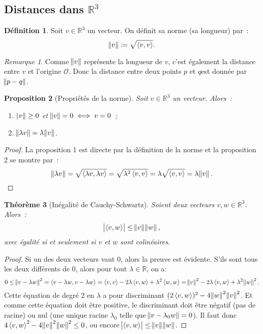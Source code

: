 \documentclass{article}
\newcommand{\R}{\mathbb R}
\newcommand{\scpr}[2]{\left\langle #1, #2\right\rangle}
\newtheorem{thm}{Théorème}[section]
\newtheorem{prp}[thm]{Proposition}
\theoremstyle{definition}
\newtheorem{déf}[thm]{Définition}
\theoremstyle{remark}
\newtheorem*{rmq}{Remarque}
\begin{document}
	\subsection{Distances dans $\R^3$}
		\begin{déf} Soit $v \in \R^3$ un vecteur. On définit sa norme (sa longueur) par~: \[\norm v \coloneqq \sqrt {\scpr vv}.\] \end{déf}

		\begin{rmq} Comme $\norm v$ représente la longueur de $v$, c'est également la distance entre $v$ et l'origine $\mathcal O$. Donc la distance entre deux points
		$p$ et $q$est donnée par $\norm {p-q}$. \end{rmq}

		\begin{prp}[Propriétés de la norme] Soit $v \in \R^3$ un vecteur. Alors~:
		\begin{enumerate}
			\item $\norm v \geq 0$ et $\norm v = 0 \iff v = 0$~;
			\item $\norm {\lambda v} = \lambda \norm v$.
		\end{enumerate}
		\end{prp}

		\begin{proof} La proposition 1 est directe par la définition de la norme et la proposition 2 se montre par~:
		\[\norm {\lambda v} = \sqrt {\scpr {\lambda v}{\lambda v}} = \sqrt {\lambda^2\scpr vv} = \lambda \sqrt {\scpr vv} = \lambda \norm v.\] \end{proof}

		\begin{thm}[Inégalité de Cauchy-Schwartz] Soient deux vecteurs $v, w \in \R^3$. Alors~:
		\[\abs{\scpr vw} \leq \norm v\norm w,\]
		avec égalité si et seulement si $v$ et $w$ sont colinéaires. \end{thm}

		\begin{proof} Si un des deux vecteurs vaut $0$, alors la preuve est évidente. S'ils sont tous les deux différents de $0$, alors pour tout $\lambda \in \R$, on a:
		\[0 \leq \norm{v-\lambda w}^2 = \scpr {v-\lambda w}{v-\lambda w} = \scpr vv -2\lambda \scpr vw + \lambda^2\scpr ww = \norm v^2 -2\lambda \scpr vw + \lambda^2\norm w^2.\]
		Cette équation de degré 2 en $\lambda$ a pour discriminant $(2\scpr vw)^2 - 4\norm w^2\norm v^2$. Et comme cette équation doit être positive, le discriminant
		doit être négatif (pas de racine) ou nul (une unique racine $\lambda_0$ telle que $\norm {v-\lambda_0w} = 0$). Il faut donc
		$4\scpr vw^2 - 4\norm v^2\norm w^2 \leq 0$, ou encore $\abs{\scpr vw} \leq \norm v\norm w$. \end{proof}
\end{document}
